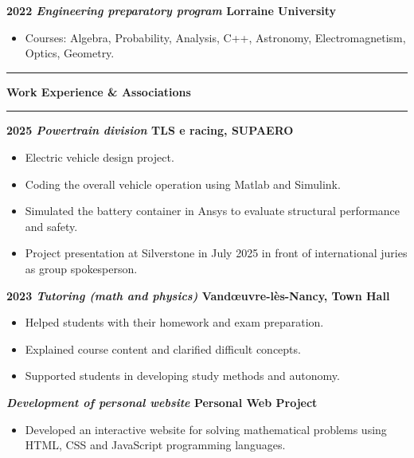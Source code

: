 \documentclass[9pt,a4paper]{article}
\begin{document}
	\textbf{2022 \hfill  \textit{Engineering preparatory program} \hfill Lorraine University} 
	
	\begin{itemize}
		\item Courses: Algebra, Probability, Analysis, C++, Astronomy, Electromagnetism, Optics, Geometry.
	\end{itemize}
	
	\vspace{0.3cm}
	
	\hrule
	\vspace{0.1cm}
	{\large \textbf{Work Experience \& Associations}}
	\vspace{0.1cm}
	\hrule
	\vspace{0.2cm}
	
		\textbf{2025 \hfill   \textit{Powertrain division}  \hfill TLS e racing, SUPAERO}

	\begin{itemize}
		\item Electric vehicle design project.
		\item Coding the overall vehicle operation using Matlab and Simulink.
		\item Simulated the battery container in Ansys to evaluate structural performance and safety.
		\item Project presentation at Silverstone in July 2025 in front of international juries as group spokesperson.
	\end{itemize}
	
	\vspace{0.2cm}
	
	\textbf{2023 \hfill \textit{Tutoring (math and physics)} \hfill Vandœuvre-lès-Nancy, Town Hall} 
	\begin{itemize}
		\item Helped students with their homework and exam preparation.
		\item Explained course content and clarified difficult concepts.
		\item Supported students in developing study methods and autonomy.
	\end{itemize}
	
	\vspace{0.2cm}
	\textbf{ \textit{Development of personal website}   \hfill Personal Web Project} 
	
	\begin{itemize}
		\item Developed an interactive website for solving mathematical problems using HTML, CSS and JavaScript programming languages.
	\end{itemize}
	
\end{document}
